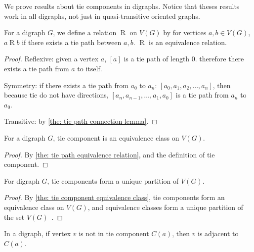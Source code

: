 We prove results about tie components in digraphs.
Notice that theses results work in all digraphs,
not just in quasi-transitive oriented graphs.

\begin{theorem}\label{the: tie path equivalence relation}
  For a digraph \(G\),
  we define a relation \(\mathrel{R}\) on \(V(G)\) by
  for vertices \(a, b \in V(G)\),
  \(a\mathrel{R}b\) if there exists a tie path between \(a, b\).
  \(\mathrel{R}\) is an equivalence relation.
\end{theorem}

\begin{proof}
  Reflexive: given a vertex \(a\),
  \([a]\) is a tie path of length 0.
  therefore there exists a tie path from \(a\) to itself.

  Symmetry: if there exists a tie path from \(a_0\) to \(a_n\):
  \([a_0, a_1, a_2, \ldots, a_n]\),
  then because tie do not have directions,
  \([a_n, a_{n-1}, \ldots, a_1, a_0]\) is a tie path from
  \(a_n\) to \(a_0\).

  Transitive: by \cref{the: tie path connection lemma}.
\end{proof}

\begin{corollary}\label{the: tie component equivalence class}
  For a digraph \(G\), tie component is an equivalence class
  on \(V(G)\).
\end{corollary}
\begin{proof}
  By \cref{the: tie path equivalence relation},
  and the definition of tie component.
\end{proof}

\begin{corollary}\label{the: tie components partition unique}
  For digraph \(G\), tie components form a unique
  partition of \(V(G)\).
\end{corollary}

\begin{proof}
  By \cref{the: tie component equivalence class},
  tie components form an equivalence class on \(V(G)\),
  and equivalence classes form a unique partition
  of the set \(V(G)\)~\cite{epp_discrete_2011}.
\end{proof}

\begin{corollary}\label{the: adjacent if not in component}
  In a digraph, if vertex \(v\) is not in tie component \(C(a)\),
  then \(v\) is adjacent to \(C(a)\).
\end{corollary}

